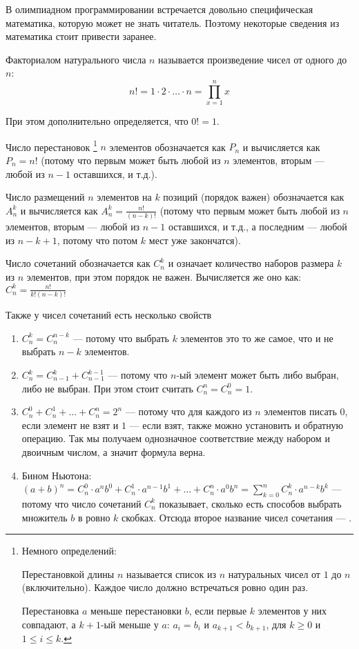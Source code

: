В олимпиадном программировании встречается довольно специфическая математика, которую может не знать читатель. Поэтому некоторые сведения из математика стоит привести заранее.

Факториалом натурального числа $n$ называется произведение чисел от одного до $n$:
$$n! = 1 \cdot 2 \cdot \ldots \cdot n = \prod\limits_{x = 1}^{n} x$$

При этом дополнительно определяется, что $0! = 1$.

Число перестановок
\footnote{Немного определений:

Перестановкой длины $n$ называется список из $n$ натуральных чисел от $1$ до $n$ (включительно). Каждое число должно встречаться ровно один раз.

Перестановка $a$  меньше перестановки $b$, если первые $k$ элементов у них совпадают, а $k + 1$-ый меньше у $a$: $a_i = b_i$ и $a_{k + 1} < b_{k + 1}$, для $k \geq 0$ и $1 \leq i \leq k$.
}
$n$ элементов обозначается как $P_n$ и вычисляется как $P_n = n!$ (потому что первым может быть любой из $n$ элементов, вторым — любой из $n - 1$ оставшихся, и т.д.).

Число размещений $n$ элементов на $k$ позиций (порядок важен) обозначается как $A_n^k$ и вычисляется как $A_n^k = \frac{n!}{(n - k)!}$ (потому что первым может быть любой из $n$ элементов, вторым — любой из $n - 1$ оставшихся, и т.д., а последним — любой из $n - k + 1$, потому что потом $k$ мест уже закончатся).

Число сочетаний обозначается как $C_n^k$ и означает количество наборов размера $k$ из $n$ элементов, при этом порядок не важен. Вычисляется же оно как: $C_n^k = \frac{n!}{k!(n - k)!}$

Также у чисел сочетаний есть несколько свойств
\begin{enumerate}
    \item $C_n^k = C_n^{n - k}$ — потому что выбрать $k$ элементов это то же самое, что и не выбрать $n - k$ элементов.
    \item $C_n^k = C_{n - 1}^{k} + C_{n - 1}^{k - 1}$ — потому что $n$-ый элемент может быть либо выбран, либо не выбран. При этом стоит считать $C_n^n = C_n^0 = 1$.
    \item $C_n^0 + C_n^1 + \ldots + C_n^n = 2^n$ — потому что для каждого из $n$ элементов писать $0$, если элемент не взят и $1$ — если взят, также можно установить и обратную операцию. Так мы получаем однозначное соответствие между набором и двоичным числом, а значит формула верна.
    \item Бином Ньютона: $(a + b)^n = C_n^0\cdot a^n b^0 + C_n^1\cdot a^{n - 1} b^1 + \ldots + C_n^n\cdot a^0 b^n = \sum\limits_{k=0}^{n} C_n^k\cdot a^{n - k} b^k$ — потому что число сочетаний $C_n^k$ показывает, сколько есть способов выбрать множитель $b$ в ровно $k$ скобках. Отсюда второе название чисел сочетания — .
\end{enumerate}

